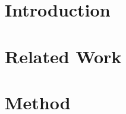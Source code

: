 \documentclass{vldb}
\begin{document}



\section{Introduction} \label{sec:intro}




% 

\section{Related Work} \label{sec:relatedWork}



\section{Method} \label{sec:method}
\end{document}
